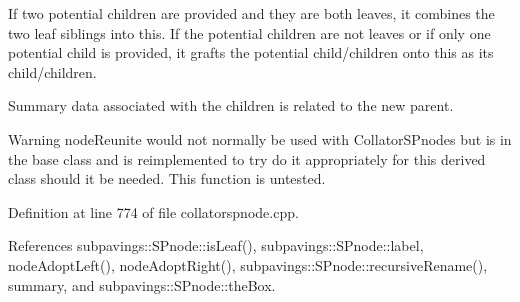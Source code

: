 \-If two potential children are provided and they are both leaves, it combines the two leaf siblings into this. \-If the potential children are not leaves or if only one potential child is provided, it grafts the potential child/children onto this as its child/children.

\-Summary data associated with the children is related to the new parent.

\begin{DoxyWarning}{\-Warning}
node\-Reunite would not normally be used with \-Collator\-S\-Pnodes but is in the base class and is reimplemented to try do it appropriately for this derived class should it be needed. \-This function is untested. 
\end{DoxyWarning}


\-Definition at line 774 of file collatorspnode.\-cpp.



\-References subpavings\-::\-S\-Pnode\-::is\-Leaf(), subpavings\-::\-S\-Pnode\-::label, node\-Adopt\-Left(), node\-Adopt\-Right(), subpavings\-::\-S\-Pnode\-::recursive\-Rename(), summary, and subpavings\-::\-S\-Pnode\-::the\-Box.


